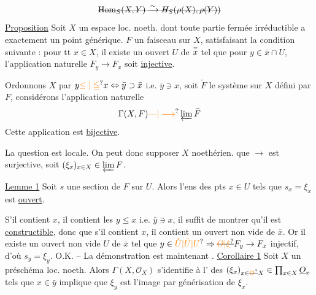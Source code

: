 \[
\deleted{\operatorname{Hom}_{S}(X,Y)\xrightarrow{\sim}H_{S}(\rho(X),\rho(Y))}
\]
\uline{Proposition} Soit $X$ un espace loc. noeth. dont toute partie fermée irréductible a exactement un point générique.  $F$ un faisceau sur $X$, satisfaisant la condition suivante : pour tt $x\in X$, il existe un   ouvert  $U$ de $\overset{\deleted{\text{--}}}{x}$ tel que pour  $y\in\bar{x}\cap U$, l'application naturelle $F_y\to F_x$ soit \uline{injective}. 

 Ordonnons $X$ par $y\unsure{\leq|\leqq}x\Leftrightarrow\bar{y}\supset\bar{x}$ i.e. $\bar{y}\ni x$, soit $\widetilde F$ le  système   sur $X$ défini par $F$, considérons l'application naturelle
\[
\Gamma(X,F)\unsure{\text{---}|\longrightarrow}\varprojlim\widetilde F
\]
Cette application est \uline{bijective}.

La question est locale. On peut donc supposer $X$ noethérien.   que $\longrightarrow$ est surjective, soit $(\xi_x)_{x\in X}\in\varprojlim F$.

\uline{Lemme 1} Soit $s$ une section de $F$ sur $U$. Alors l'ens des pts $x\in U$ tels que $s_x=\xi_x$ est \uline{ouvert}.

S'il contient $x$, il contient les $y\leq x$ i.e.  $\bar{y}\ni x$, il suffit de montrer qu'il est \uline{constructible}, donc que s'il contient $x$, il contient  un ouvert non vide de $\bar{x}$. Or il existe un ouvert non vide $U$ de $\bar{x}$ tel que $y\in\unsure{\mathring U|\tilde U|U}\Rightarrow \deleted{\unsure{O|\xi}}F_y\to F_x$ injectif, d'où $s_y=\xi_y$. O.K. -- La démonstration est maintenant .
\uline{Corollaire 1} Soit $X$ un préschéma loc. noeth. Alors
$\Gamma(X,\mathcal O_{X})$ s'identifie à l' des $(\xi_x)_{x\in\deleted{\unsure{O}}X}\in\prod_{x\in X}\underline{O}_x$ tels que $x\in\bar{y}$ implique que $\xi_y$ est l'image par générisation de $\xi_x$.

